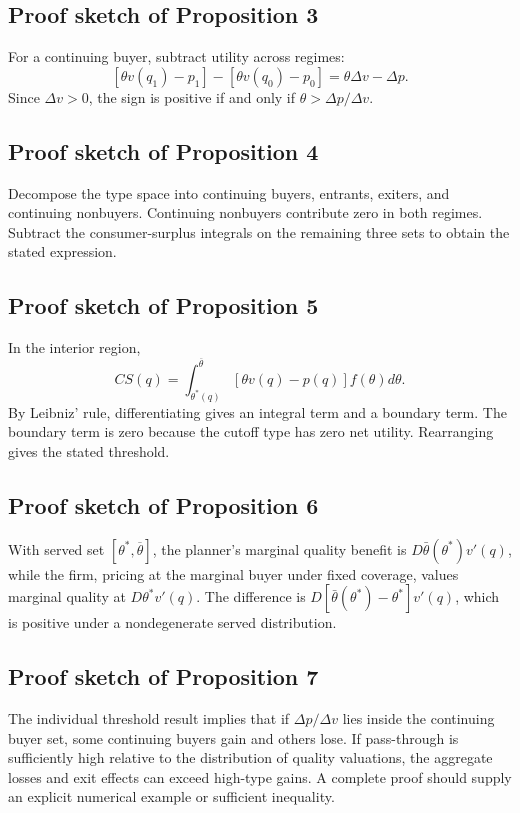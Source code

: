\documentclass[12pt]{article}
\theoremstyle{plain}
\theoremstyle{definition}
\theoremstyle{remark}
\begin{document}
\subsection*{Proof sketch of Proposition 3}
For a continuing buyer, subtract utility across regimes:
\[
[\theta v(q_1)-p_1]-[\theta v(q_0)-p_0]=\theta\Delta v-\Delta p.
\]
Since $\Delta v>0$, the sign is positive if and only if $\theta>\Delta p/\Delta v$.

\subsection*{Proof sketch of Proposition 4}
Decompose the type space into continuing buyers, entrants, exiters, and continuing nonbuyers. Continuing nonbuyers contribute zero in both regimes. Subtract the consumer-surplus integrals on the remaining three sets to obtain the stated expression.

\subsection*{Proof sketch of Proposition 5}
In the interior region,
\[
 CS(q)=\int_{\theta^*(q)}^{\overline\theta}[\theta v(q)-p(q)]f(\theta)d\theta.
\]
By Leibniz' rule, differentiating gives an integral term and a boundary term. The boundary term is zero because the cutoff type has zero net utility. Rearranging gives the stated threshold.

\subsection*{Proof sketch of Proposition 6}
With served set $[\theta^*,\overline\theta]$, the planner's marginal quality benefit is $D\bar\theta(\theta^*)v'(q)$, while the firm, pricing at the marginal buyer under fixed coverage, values marginal quality at $D\theta^*v'(q)$. The difference is $D[\bar\theta(\theta^*)-\theta^*]v'(q)$, which is positive under a nondegenerate served distribution.

\subsection*{Proof sketch of Proposition 7}
The individual threshold result implies that if $\Delta p/\Delta v$ lies inside the continuing buyer set, some continuing buyers gain and others lose. If pass-through is sufficiently high relative to the distribution of quality valuations, the aggregate losses and exit effects can exceed high-type gains. A complete proof should supply an explicit numerical example or sufficient inequality.
\end{document}
